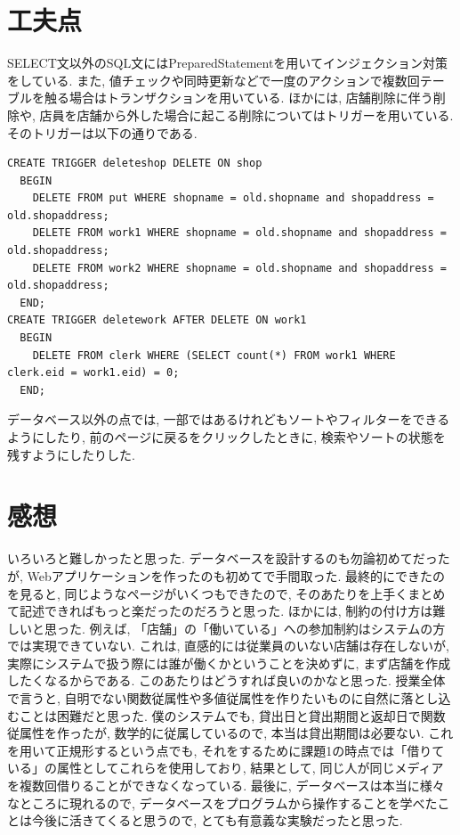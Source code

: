 \documentclass{jarticle}
\begin{document}
\section{工夫点}
SELECT文以外のSQL文にはPreparedStatementを用いてインジェクション対策をしている. また, 値チェックや同時更新などで一度のアクションで複数回テーブルを触る場合はトランザクションを用いている. ほかには, 店舗削除に伴う削除や, 店員を店舗から外した場合に起こる削除についてはトリガーを用いている. そのトリガーは以下の通りである.
\begin{verbatim}
CREATE TRIGGER deleteshop DELETE ON shop
  BEGIN
    DELETE FROM put WHERE shopname = old.shopname and shopaddress = old.shopaddress;
    DELETE FROM work1 WHERE shopname = old.shopname and shopaddress = old.shopaddress;
    DELETE FROM work2 WHERE shopname = old.shopname and shopaddress = old.shopaddress;
  END;
CREATE TRIGGER deletework AFTER DELETE ON work1
  BEGIN
    DELETE FROM clerk WHERE (SELECT count(*) FROM work1 WHERE clerk.eid = work1.eid) = 0;
  END;
\end{verbatim}
データベース以外の点では, 一部ではあるけれどもソートやフィルターをできるようにしたり, 前のページに戻るをクリックしたときに, 検索やソートの状態を残すようにしたりした.

\section{感想}
いろいろと難しかったと思った. データベースを設計するのも勿論初めてだったが, Webアプリケーションを作ったのも初めてで手間取った. 最終的にできたのを見ると, 同じようなページがいくつもできたので, そのあたりを上手くまとめて記述できればもっと楽だったのだろうと思った. ほかには, 制約の付け方は難しいと思った. 例えば, 「店舗」の「働いている」への参加制約はシステムの方では実現できていない. これは, 直感的には従業員のいない店舗は存在しないが, 実際にシステムで扱う際には誰が働くかということを決めずに, まず店舗を作成したくなるからである. このあたりはどうすれば良いのかなと思った. 授業全体で言うと, 自明でない関数従属性や多値従属性を作りたいものに自然に落とし込むことは困難だと思った. 僕のシステムでも, 貸出日と貸出期間と返却日で関数従属性を作ったが, 数学的に従属しているので, 本当は貸出期間は必要ない. これを用いて正規形するという点でも, それをするために課題1の時点では「借りている」の属性としてこれらを使用しており, 結果として, 同じ人が同じメディアを複数回借りることができなくなっている. 最後に, データベースは本当に様々なところに現れるので, データベースをプログラムから操作することを学べたことは今後に活きてくると思うので, とても有意義な実験だったと思った.
\end{document}
